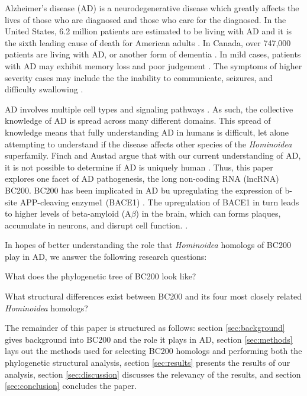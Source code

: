 \documentclass[conference, 11pt]{IEEEtran}
\begin{document}
Alzheimer's disease (AD) is a neurodegenerative disease which greatly affects the lives of those who are diagnosed and those who care for the diagnosed. 
In the United States, 6.2 million patients are estimated to be living with AD and it is the sixth leading cause of death for American adults \cite{AlzheimersDisease}. 
In Canada, over 747,000 patients are living with AD, or another form of dementia \cite{ADcanada}. 
In mild cases, patients with AD may exhibit memory loss and poor judgement \cite{alzheimersSigns}. 
The symptoms of higher severity cases may include the the inability to communicate, seizures, and difficulty swallowing \cite{alzheimersSigns}.

AD involves multiple cell types and signaling pathways \cite{zhang2021role}. 
As such, the collective knowledge of AD is spread across many different domains. 
This spread of knowledge means that fully understanding AD in humans is difficult, let alone attempting to understand if the disease affects other species of the \emph{Hominoidea} superfamily.
Finch and Austad argue that with our current understanding of AD, it is not possible to determine if AD is uniquely human \cite{finch2015commentary}. 
Thus, this paper explores one facet of AD pathogenesis, the long non-coding RNA (lncRNA) BC200. 
BC200 has been implicated in AD bu upregulating the expression of b-site APP-cleaving enzyme1 (BACE1) \cite{li2018identification,zhang2021role}. 
The upregulation of BACE1 in turn leads to higher levels of beta-amyloid (A$\beta$) in the brain, which can forms plaques, accumulate in neurons, and disrupt cell function. \cite{li2018identification,zhang2021role}. 

In hopes of better understanding the role that \emph{Hominoidea} homologs of BC200 play in AD, we answer the following research questions:

\begin{questions}
  \item What does the phylogenetic tree of BC200 look like?
  \item What structural differences exist between BC200 and its four most closely related \emph{Hominoidea} homologs?
\end{questions}

The remainder of this paper is structured as follows: section \ref{sec:background} gives background into BC200 and the role it plays in AD, section \ref{sec:methods} lays out the methods used for selecting BC200 homologs and performing both the phylogenetic structural analysis, section \ref{sec:results} presents the results of our analysis, section \ref{sec:discussion} discusses the relevancy of the results, and section \ref{sec:conclusion} concludes the paper.
\end{document}
